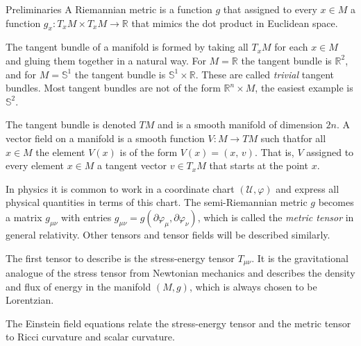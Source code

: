 \documentclass{beamer}
\begin{document}
    \begin{frame}{Preliminaries}
        A Riemannian metric is a function $g$ that assigned to every
        $x\in{M}$ a function $g_{x}:T_{x}M\times{T}_{x}M\rightarrow\mathbb{R}$
        that mimics the dot product in Euclidean space.
    \end{frame}
    \begin{frame}
        The tangent bundle of a manifold is formed by taking all $T_{x}M$ for
        each $x\in{M}$ and gluing them together in a natural way. For
        $M=\mathbb{R}$ the tangent bundle is $\mathbb{R}^{2}$, and for
        $M=\mathbb{S}^{1}$ the tangent bundle is
        $\mathbb{S}^{1}\times\mathbb{R}$. These are called \textit{trivial}
        tangent bundles. Most tangent bundles are not of the form
        $\mathbb{R}^{n}\times{M}$, the easiest example is $\mathbb{S}^{2}$.
        \par\hfill\par
        The tangent bundle is denoted $TM$ and is a smooth manifold of dimension
        $2n$. A vector field on a manifold is a smooth function
        $V:M\rightarrow{T}M$ such thatfor all $x\in{M}$ the element
        $V(x)$ is of the form $V(x)=(x,\,v)$. That is, $V$ assigned to every
        element $x\in{M}$ a tangent vector $v\in{T}_{x}M$ that starts at the
        point $x$.
    \end{frame}
    \begin{frame}
        In physics it is common to work in a coordinate chart
        $(\mathcal{U},\varphi)$ and express all physical quantities in terms of
        this chart. The semi-Riemannian metric $g$ becomes a matrix
        $g_{\mu\nu}$ with entries
        $g_{\mu\nu}=g(\partial\varphi_{\mu},\partial\varphi_{\nu})$, which is
        called the \textit{metric tensor} in general relativity. Other tensors
        and tensor fields will be described similarly.
    \end{frame}
    \begin{frame}
        The first tensor to describe is the stress-energy tensor $T_{\mu\nu}$.
        It is the gravitational analogue of the stress tensor from Newtonian
        mechanics and describes the density and flux of energy in the
        manifold $(M,g)$, which is always chosen to be Lorentzian.
        \par\hfill\par
        The Einstein field equations relate the stress-energy tensor and the
        metric tensor to Ricci curvature and scalar curvature.
    \end{frame}
\end{document}
